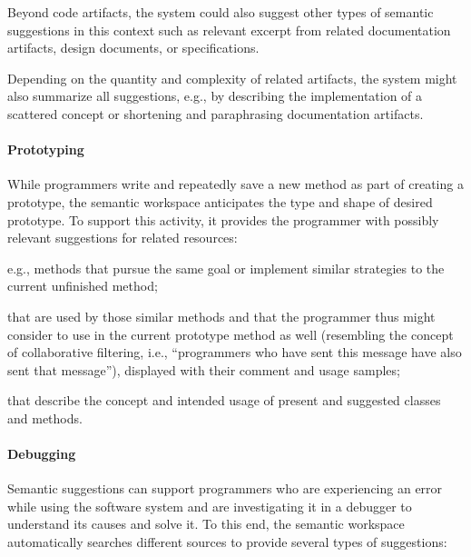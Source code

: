 	Beyond code artifacts, the system could also suggest other types of semantic suggestions in this context such as relevant excerpt from related documentation artifacts, design documents, or specifications.

	Depending on the quantity and complexity of related artifacts, the system might also summarize all suggestions, e.g., by describing the implementation of a scattered concept or shortening and paraphrasing documentation artifacts.

	\paragraph{Prototyping}
	While programmers write and repeatedly save a new method as part of creating a prototype, the semantic workspace anticipates the type and shape of desired prototype.
	To support this activity, it provides the programmer with possibly relevant suggestions for related resources:

	\begin{description}[noextralabelsep]
		\item[similar methods,] e.g., methods that pursue the same goal or implement similar strategies to the current unfinished method;
		\item[correlated methods and classes] that are used by those similar methods and that the programmer thus might consider to use in the current prototype method as well (resembling the concept of collaborative filtering, i.e., ``programmers who have sent this message have also sent that message''), displayed with their comment and usage samples;
		\item[documentation artifacts] that describe the concept and intended usage of present and suggested classes and methods.
	\end{description}

	\paragraph{Debugging}
	Semantic suggestions can support programmers who are experiencing an error while using the software system and are investigating it in a debugger to understand its causes and solve it.
	To this end, the semantic workspace automatically searches different sources to provide several types of suggestions:

